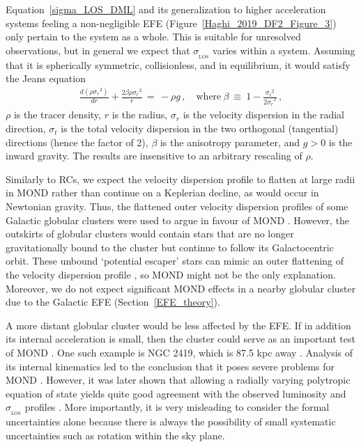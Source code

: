\documentclass[fleqn,usenatbib,useAMS,onecolumn]{mnras} %
\begin{document}
Equation~\ref{sigma_LOS_DML} and its generalization to higher acceleration systems feeling a non-negligible EFE (Figure~\ref{Haghi_2019_DF2_Figure_3}) only pertain to the system as a whole. This is suitable for unresolved observations, but in general we expect that $\sigma_{_\text{LOS}}$ varies within a system. Assuming that it is spherically symmetric, collisionless, and in equilibrium, it would satisfy the Jeans equation
\begin{eqnarray}
	\frac{d\left( \rho {\sigma_r}^2 \right)}{dr} + \frac{2\beta\rho{\sigma_r}^2}{r} \, = \, -\rho g \, , \quad \text{where} ~ \beta ~\equiv~ 1 - \frac{{\sigma_t}^2}{{2\sigma_r}^2} \, ,
	\label{Jeans_equation_spherical}
\end{eqnarray}
$\rho$ is the tracer density, $r$ is the radius, $\sigma_r$ is the velocity dispersion in the radial direction, $\sigma_t$ is the total velocity dispersion in the two orthogonal (tangential) directions (hence the factor of 2), $\beta$ is the anisotropy parameter, and $g > 0$ is the inward gravity. The results are insensitive to an arbitrary rescaling of $\rho$.

Similarly to RCs, we expect the velocity dispersion profile to flatten at large radii in MOND rather than continue on a Keplerian decline, as would occur in Newtonian gravity. Thus, the flattened outer velocity dispersion profiles of some Galactic globular clusters were used to argue in favour of MOND \citep{Hernandez_2013, Durazo_2017}. However, the outskirts of globular clusters would contain stars that are no longer gravitationally bound to the cluster but continue to follow its Galactocentric orbit. These unbound `potential escaper' stars can mimic an outer flattening of the velocity dispersion profile \citep{Claydon_2017}, so MOND might not be the only explanation. Moreover, we do not expect significant MOND effects in a nearby globular cluster due to the Galactic EFE (Section~\ref{EFE_theory}).

A more distant globular cluster would be less affected by the EFE. If in addition its internal acceleration is small, then the cluster could serve as an important test of MOND \citep{Haghi_2009, Haghi_2011}. One such example is NGC 2419, which is 87.5 kpc away \citep{Di_Criscienzo_2011}. Analysis of its internal kinematics led to the conclusion that it poses severe problems for MOND \citep{Ibata_2011a, Ibata_2011b}. However, it was later shown that allowing a radially varying polytropic equation of state yields quite good agreement with the observed luminosity and $\sigma_{_\text{LOS}}$ profiles \citep{Sanders_2012a, Sanders_2012b}. More importantly, it is very misleading to consider the formal uncertainties alone because there is always the possibility of small systematic uncertainties such as rotation within the sky plane.
\end{document}
